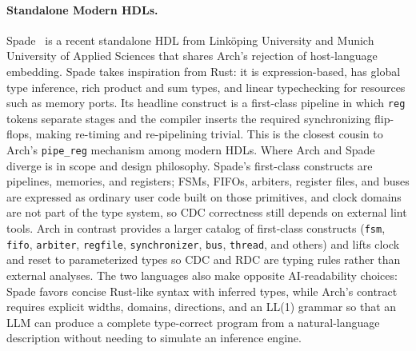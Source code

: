 \documentclass[11pt,twocolumn]{article}
\begin{document}
\paragraph{Standalone Modern HDLs.}
Spade~\cite{spade} is a recent standalone HDL from Linköping University and Munich University of Applied Sciences that shares Arch's rejection of host-language embedding. Spade takes inspiration from Rust: it is expression-based, has global type inference, rich product and sum types, and linear typechecking for resources such as memory ports. Its headline construct is a first-class pipeline in which \texttt{reg} tokens separate stages and the compiler inserts the required synchronizing flip-flops, making re-timing and re-pipelining trivial. This is the closest cousin to Arch's \texttt{pipe\_reg} mechanism among modern HDLs. Where Arch and Spade diverge is in scope and design philosophy. Spade's first-class constructs are pipelines, memories, and registers; FSMs, FIFOs, arbiters, register files, and buses are expressed as ordinary user code built on those primitives, and clock domains are not part of the type system, so CDC correctness still depends on external lint tools. Arch in contrast provides a larger catalog of first-class constructs (\texttt{fsm}, \texttt{fifo}, \texttt{arbiter}, \texttt{regfile}, \texttt{synchronizer}, \texttt{bus}, \texttt{thread}, and others) and lifts clock and reset to parameterized types so CDC and RDC are typing rules rather than external analyses. The two languages also make opposite AI-readability choices: Spade favors concise Rust-like syntax with inferred types, while Arch's contract requires explicit widths, domains, directions, and an LL(1) grammar so that an LLM can produce a complete type-correct program from a natural-language description without needing to simulate an inference engine.
\end{document}
